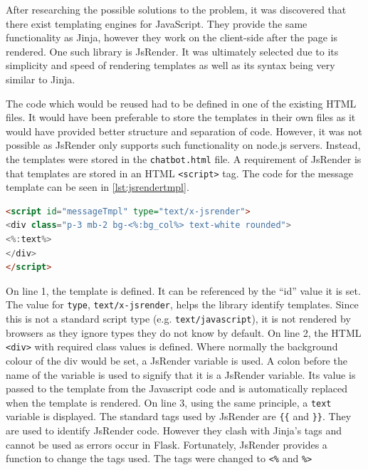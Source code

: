 \documentclass[12pt,a4paper]{article}
\newcommand{\captionstyle}[1] {
    \small{#1}
}
\begin{document}
After researching the possible solutions to the problem, it was discovered that there exist templating engines for JavaScript. They provide the same functionality as Jinja, however they work on the client-side after the page is rendered. One such library is JsRender. It was ultimately selected due to its simplicity and speed of rendering templates as well as its syntax being very similar to Jinja. 

The code which would be reused had to be defined in one of the existing HTML files. It would have been preferable to store the templates in their own files as it would have provided better structure and separation of code. However, it was not possible as JsRender only supports such functionality on node.js servers. Instead, the templates were stored in the \texttt{chatbot.html} file. A requirement of JsRender is that templates are stored in an HTML \texttt{<script>} tag. The code for the message template can be seen in \cref{lst:jsrendertmpl}. 

\begin{lstlisting}[language=HTML, caption={\captionstyle{The code for the JsRender message template.}}, label={lst:jsrendertmpl}]
<script id="messageTmpl" type="text/x-jsrender">
<div class="p-3 mb-2 bg-<%:bg_col%> text-white rounded">
<%:text%>
</div>
</script>
\end{lstlisting}

On line 1, the template is defined. It can be referenced by the “id” value it is set. The value for \texttt{type}, \texttt{text/x-jsrender}, helps the library identify templates. Since this is not a standard script type (e.g. \texttt{text/javascript}), it is not rendered by browsers as they ignore types they do not know by default. On line 2, the HTML \texttt{<div>} with required class values is defined. Where normally the background colour of the div would be set, a JsRender variable is used. A colon before the name of the variable is used to signify that it is a JsRender variable. Its value is passed to the template from the Javascript code and is automatically replaced when the template is rendered. On line 3, using the same principle, a \texttt{text} variable is displayed. The standard tags used by JsRender are \verb|{{| and \verb|}}|. They are used to identify JsRender code. However they clash with Jinja’s tags and cannot be used as errors occur in Flask. Fortunately, JsRender provides a function to change the tags used. The tags were changed to \texttt{<\%} and \texttt{\%>} 
\end{document}
